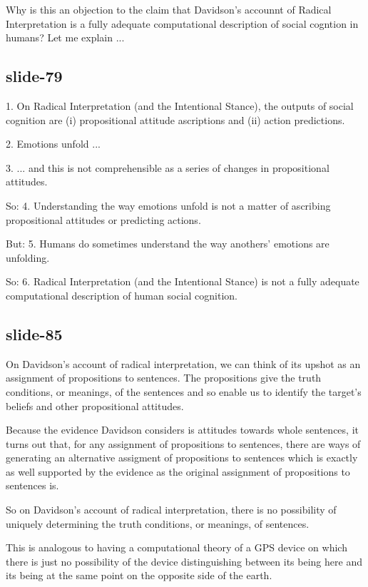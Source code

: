 \documentclass[12pt,\papersize]{extarticle}
\begin{document}
Why is this an objection to the claim that Davidson’s accounnt of
Radical Interpretation is a fully adequate computational description
of social cogntion in humans?  Let me explain ...

\subsection{slide-79}
1. On Radical Interpretation (and the Intentional Stance), the outputs of social cognition are (i) propositional attitude ascriptions and (ii) action predictions.

2. Emotions unfold ...

3. ... and this is not comprehensible as a series of changes in propositional attitudes.

So: 4. Understanding the way emotions unfold is not a matter of ascribing propositional attitudes or predicting actions.

But: 5. Humans do sometimes understand the way anothers’ emotions are unfolding.

So: 6. Radical Interpretation (and the Intentional Stance) is not a fully adequate computational description of human social cognition.


\subsection{slide-85}
On Davidson’s account of radical interpretation, we can think of its upshot
as an assignment of propositions to sentences.
The propositions give the truth conditions, or meanings, of the sentences and
so enable us to identify the target’s beliefs and other propositional attitudes.

Because the evidence Davidson considers is attitudes towards whole sentences,
it turns out that, for any assignment of propositions to sentences,
there are ways of generating an alternative assigment of propositions to sentences
which is exactly as well supported by the evidence as the original assignment
of propositions to sentences is.

So on Davidson’s account of radical interpretation, there is no possibility
of uniquely determining the truth conditions, or meanings, of sentences.

This is analogous to having a computational theory of a GPS device on which
there is just no possibility of the device distinguishing between its being here
and its being at the same point on the opposite side of the earth.
\end{document}
